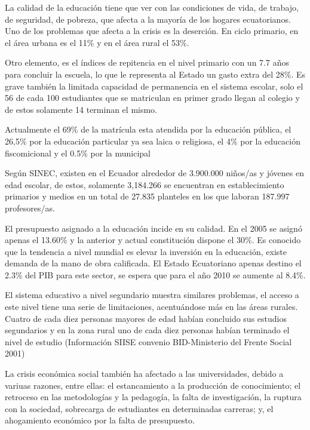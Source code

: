 La calidad  de la educación  tiene que ver con  las condiciones de vida, de trabajo, de seguridad, de pobreza, que afecta a la mayoría de los hogares ecuatorianos. Uno de los problemas  que afecta a la crisis es la deserción. En  ciclo primario, en el área urbana es el 11\% y en el área rural el 53\%. 

Otro elemento, es el índices de repitencia en el nivel primario con un 7.7 años para concluir la escuela, lo que le representa al Estado un gasto  extra del 28\%. Es grave también la limitada capacidad de permanencia en el sistema escolar, solo el 56 de cada 100 estudiantes que se matriculan en primer grado llegan al colegio y de estos solamente 14 terminan el mismo.

Actualmente el 69\% de la matrícula esta atendida por la educación pública, el 26,5\% por la educación particular ya sea laica o religiosa, el 4\% por la educación fiscomicional y el 0.5\% por la municipal

Según SINEC, existen en el Ecuador alrededor de 3.900.000 niños/as  y jóvenes en edad escolar, de estos, solamente 3,184.266 se encuentran en establecimiento primarios y medios en un total de 27.835 planteles  en los que laboran 187.997 profesores/as.

El  presupuesto asignado a la educación incide en su calidad. En el 2005 se asignó  apenas el 13.60\% y la anterior y actual constitución dispone el 30\%. Es conocido que la tendencia a nivel mundial es elevar la inversión en la educación, existe demanda de la mano de obra calificada. El Estado Ecuatoriano apenas destino el 2.3\% del PIB para este sector, se espera que para el año 2010 se aumente al 8.4\%.

El sistema educativo a nivel segundario  muestra similares problemas, el acceso a este nivel tiene una serie de limitaciones, acentuándose más en las áreas rurales. Cuatro de cada diez personas mayores de edad habían concluido sus estudios segundarios  y en la zona rural  uno de cada diez personas habían terminado el nivel de estudio (Información SIISE convenio BID-Ministerio del Frente Social 2001)

La crisis económica social también  ha afectado a las universidades, debido a variuas razones, entre ellas: el estancamiento a la producción de conocimiento; el retroceso en las metodologías y la pedagogía, la falta de investigación, la ruptura con la sociedad, sobrecarga de estudiantes en determinadas carreras; y, el ahogamiento económico por la falta de presupuesto.


